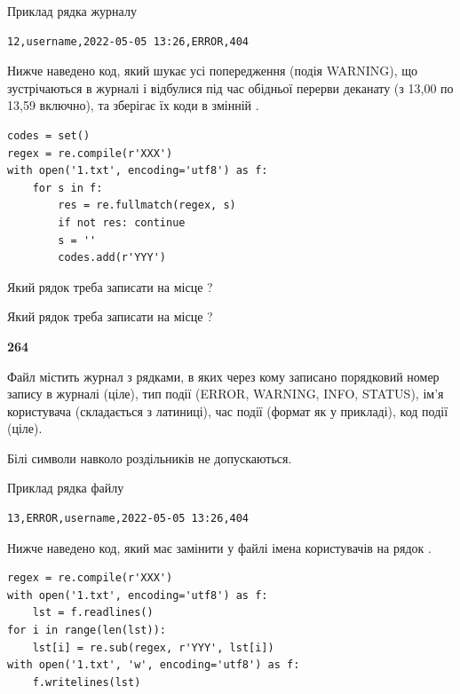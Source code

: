 Приклад рядка журналу



\begin{verbatim}
12,username,2022-05-05 13:26,ERROR,404
\end{verbatim}


Нижче наведено код, який шукає усі попередження (подія WARNING), що зустрі\-ча\-ються в журналі і відбулися під час обідньої перерви деканату (з 13,00 по 13,59 включно), та зберігає їх коди в змінній .



\begin{verbatim}
codes = set()
regex = re.compile(r'XXX')
with open('1.txt', encoding='utf8') as f:
    for s in f:
        res = re.fullmatch(regex, s)
        if not res: continue
        s = ''
        codes.add(r'YYY')
\end{verbatim}







Який рядок треба записати на місце  ?\par
\vspace{5mm}


Який рядок треба записати на місце  ?\par


\newpage

{\begin {center}\textbf{ 264}\end {center}}\par
Файл  містить журнал з рядками, в яких через кому записано поряд\-ко\-вий номер запису в журналі (ціле), тип події (ERROR, WARNING, INFO, STATUS), ім'я користувача (складається з латиниці), час події (фор\-мат як у прикладі), код події (ціле).

Білі символи навколо роздільників не допускаються.

Приклад рядка файлу



\begin{verbatim}
13,ERROR,username,2022-05-05 13:26,404
\end{verbatim}


Нижче наведено код, який має замінити у файлі імена користувачів на рядок .



\begin{verbatim}
regex = re.compile(r'XXX')
with open('1.txt', encoding='utf8') as f:
    lst = f.readlines()
for i in range(len(lst)):
    lst[i] = re.sub(regex, r'YYY', lst[i])
with open('1.txt', 'w', encoding='utf8') as f:
    f.writelines(lst)
\end{verbatim}







